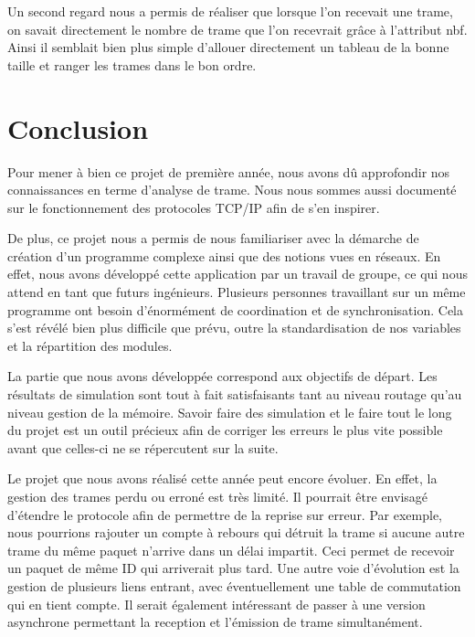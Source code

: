 \documentclass[a4paper,11pt]{article}
\begin{document}
Un second regard nous a permis de réaliser que lorsque l'on recevait une trame, on savait directement le nombre de trame que l'on recevrait grâce à l’attribut nbf. Ainsi il semblait bien plus simple d'allouer directement un tableau de la bonne taille et ranger les trames dans le bon ordre.

\section{Conclusion}

Pour mener à bien ce projet de première année, nous avons dû approfondir nos connaissances en terme d'analyse de trame. Nous nous sommes aussi documenté sur le fonctionnement des protocoles TCP/IP afin de s'en inspirer.

De plus, ce projet nous a permis de nous familiariser avec la démarche de création d’un programme complexe ainsi  que des notions vues en réseaux. En effet, nous avons développé cette application par un travail de groupe, ce qui nous attend en tant que futurs ingénieurs. Plusieurs personnes travaillant sur un même programme ont besoin d'énormément de coordination et de synchronisation. Cela s'est révélé bien plus difficile que prévu, outre la standardisation de nos variables et la répartition des modules.

La partie que nous avons développée correspond aux objectifs de départ. Les résultats de simulation sont tout à fait satisfaisants tant au niveau routage qu’au niveau gestion de la mémoire. Savoir faire des simulation et le faire tout le long du projet est un outil précieux afin de corriger les erreurs le plus vite possible avant que celles-ci ne se répercutent sur la suite.

Le projet que nous avons réalisé cette année peut encore évoluer.
En effet, la gestion des trames perdu ou erroné est très limité.
Il pourrait être envisagé d'étendre le protocole afin de permettre de la
reprise sur erreur. Par exemple, nous pourrions rajouter un compte à
rebours qui détruit la trame si aucune autre trame du même paquet 
n'arrive dans un délai impartit. Ceci permet de recevoir un paquet de
même ID qui arriverait plus tard. Une autre voie d'évolution est la
gestion de plusieurs liens entrant, avec éventuellement une table de
commutation qui en tient compte. Il serait également intéressant de
passer à une version asynchrone permettant la reception et l'émission de
trame simultanément.
\end{document}
